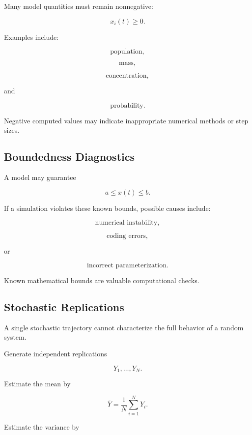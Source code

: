 Many model quantities must remain nonnegative:

\[
\boxed{
x_i(t)\geq0.
}
\]

Examples include:

\[
\boxed{
\text{population},
}
\]

\[
\boxed{
\text{mass},
}
\]

\[
\boxed{
\text{concentration},
}
\]

and

\[
\boxed{
\text{probability}.
}
\]

Negative computed values may indicate inappropriate numerical methods or
step sizes.

\subsection{Boundedness Diagnostics}
\label{subsec:simulation-boundedness}

A model may guarantee

\[
\boxed{
a\leq x(t)\leq b.
}
\]

If a simulation violates these known bounds, possible causes include:

\[
\boxed{
\text{numerical instability},
}
\]

\[
\boxed{
\text{coding errors},
}
\]

or

\[
\boxed{
\text{incorrect parameterization}.
}
\]

Known mathematical bounds are valuable computational checks.

\subsection{Stochastic Replications}
\label{subsec:stochastic-replications}

A single stochastic trajectory cannot characterize the full behavior of a
random system.

Generate independent replications

\[
\boxed{
Y_1,\ldots,Y_N.
}
\]

Estimate the mean by

\[
\boxed{
\overline{Y}
=
\frac1N
\sum_{i=1}^{N}
Y_i.
}
\]

Estimate the variance by

